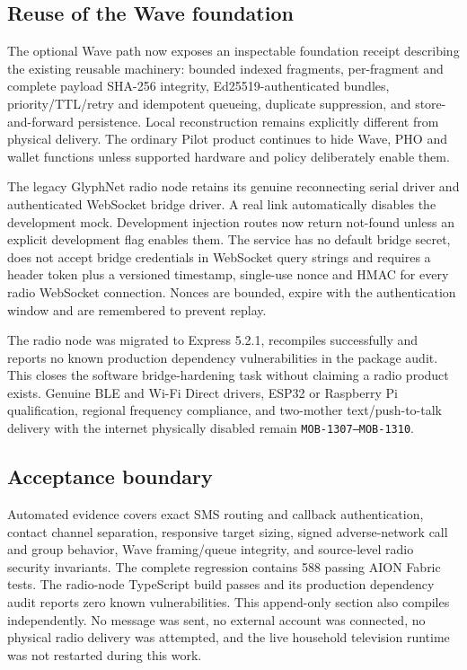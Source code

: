 \subsection{Reuse of the Wave foundation}

The optional Wave path now exposes an inspectable foundation receipt describing the
existing reusable machinery: bounded indexed fragments, per-fragment and complete
payload SHA-256 integrity, Ed25519-authenticated bundles, priority/TTL/retry and
idempotent queueing, duplicate suppression, and store-and-forward persistence.
Local reconstruction remains explicitly different from physical delivery.  The
ordinary Pilot product continues to hide Wave, PHO and wallet functions unless
supported hardware and policy deliberately enable them.

The legacy GlyphNet radio node retains its genuine reconnecting serial driver and
authenticated WebSocket bridge driver.  A real link automatically disables the
development mock.  Development injection routes now return not-found unless an
explicit development flag enables them.  The service has no default bridge secret,
does not accept bridge credentials in WebSocket query strings and requires a header
token plus a versioned timestamp, single-use nonce and HMAC for every radio WebSocket
connection.  Nonces are bounded, expire with the authentication window and are
remembered to prevent replay.

The radio node was migrated to Express 5.2.1, recompiles successfully and reports no
known production dependency vulnerabilities in the package audit.  This closes the
software bridge-hardening task without claiming a radio product exists.  Genuine BLE
and Wi-Fi Direct drivers, ESP32 or Raspberry Pi qualification, regional frequency
compliance, and two-mother text/push-to-talk delivery with the internet physically
disabled remain \texttt{MOB-1307--MOB-1310}.

\subsection{Acceptance boundary}

Automated evidence covers exact SMS routing and callback authentication, contact
channel separation, responsive target sizing, signed adverse-network call and group
behavior, Wave framing/queue integrity, and source-level radio security invariants.
The complete regression contains 588 passing AION Fabric tests.  The radio-node
TypeScript build passes and its production dependency audit reports zero known
vulnerabilities.  This append-only section also compiles independently.
No message was sent, no external account was connected, no physical radio delivery
was attempted, and the live household television runtime was not restarted during
this work.
